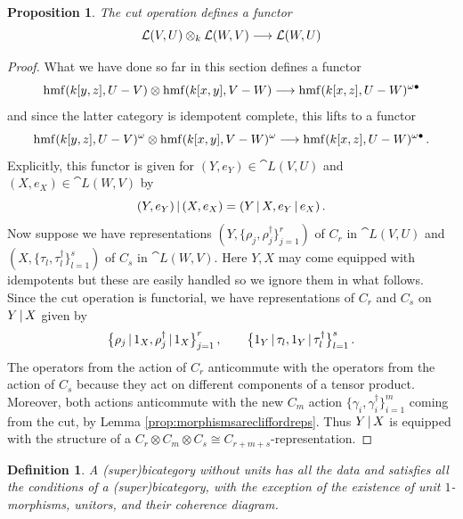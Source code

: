 \documentclass[english,letter paper,12pt,leqno]{article}
\newtheorem{proposition}[theorem]{Proposition}
\theoremstyle{example}
\newtheorem{definition}[theorem]{Definition}
\numberwithin{equation}{section}
\def\be{\begin{equation}}
\def\ee{\end{equation}}
\DeclareMathOperator{\hmf}{hmf}
\begin{document}
\begin{proposition}\label{prop:cutisafunctor} The cut operation defines a functor
\be\label{eq:cutisafunctor}
\cat{L}(V,U) \otimes_k \cat{L}(W,V) \lto \cat{L}(W, U)
\ee
\end{proposition}
\begin{proof}
What we have done so far in this section defines a functor
\[
\hmf( k[y,z], U - V ) \otimes \hmf( k[x,y], V - W ) \lto \hmf( k[x,z], U - W )^{\omega \bullet}
\]
and since the latter category is idempotent complete, this lifts to a functor
\[
\hmf( k[y,z], U - V )^{\omega} \otimes \hmf( k[x,y], V - W )^{\omega} \lto \hmf( k[x,z], U - W )^{\omega \bullet}\,.
\]
Explicitly, this functor is given for $(Y,e_Y) \in \cat{L}(V,U)$ and $(X,e_X) \in \cat{L}(W,V)$ by
\[
(Y, e_Y) \,|\, (X, e_X) = (Y \,|\, X, e_Y \,|\, e_X)\,.
\]
Now suppose we have representations $( Y, \{ \rho_j, \rho_j^\dagger \}_{j=1}^r )$ of $C_r$ in $\cat{L}(V,U)$ and $( X, \{ \tau_l, \tau^\dagger_l \}_{l=1}^s )$ of $C_s$ in $\cat{L}(W,V)$. Here $Y,X$ may come equipped with idempotents but these are easily handled so we ignore them in what follows. Since the cut operation is functorial, we have representations of $C_r$ and $C_s$ on $Y \,|\, X$ given by
\[
\big\{ \rho_j \,|\, 1_X, \rho_j^\dagger \,|\, 1_X \big\}_{j=1}^r\,, \qquad \big\{ 1_Y \,|\, \tau_l, 1_Y \,|\, \tau_l^\dagger \big\}_{l=1}^s\,.
\]
The operators from the action of $C_r$ anticommute with the operators from the action of $C_s$ because they act on different components of a tensor product. Moreover, both actions anticommute with the new $C_m$ action $\{ \gamma_i, \gamma_i^\dagger \}_{i=1}^m$ coming from the cut, by Lemma \ref{prop:morphismsarecliffordreps}. Thus $Y \,|\, X$ is equipped with the structure of a $C_r \otimes C_m \otimes C_s \cong C_{r+m+s}$-representation.
\end{proof}


\begin{definition} A \textsl{(super)bicategory without units} has all the data and satisfies all the conditions of a (super)bicategory, with the exception of the existence of unit $1$-morphisms, unitors, and their coherence diagram.
\end{definition}
\end{document}
